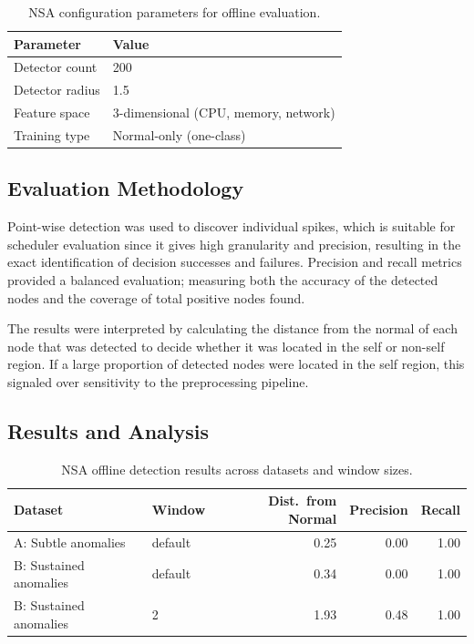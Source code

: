 \begin{table}[h]
    \centering
    \begin{tabular}{ll}
        \hline
        \textbf{Parameter} & \textbf{Value} \\
        \hline
        Detector count & 200 \\
        Detector radius & 1.5 \\
        Feature space & 3-dimensional (CPU, memory, network) \\
        Training type & Normal-only (one-class) \\
        \hline
    \end{tabular}
    \caption{NSA configuration parameters for offline evaluation.}
    \label{tab:nsa-params}
\end{table}

\subsection{Evaluation Methodology}

Point-wise detection was used to discover individual spikes, which is suitable for scheduler evaluation since it gives high granularity and precision, resulting in the exact identification of decision successes and failures. Precision and recall metrics provided a balanced evaluation; measuring both the accuracy of the detected nodes and the coverage of total positive nodes found.  

The results were interpreted by calculating the distance from the normal of each node that was detected to decide whether it was located in the self or non-self region. If a large proportion of detected nodes were located in the self region, this signaled over sensitivity to the preprocessing pipeline.

\subsection{Results and Analysis}

\begin{table}[h]
    \centering
    \begin{tabular}{llrrr}
        \hline
        \textbf{Dataset} & \textbf{Window} & \textbf{Dist.\ from Normal} & \textbf{Precision} & \textbf{Recall} \\
        \hline
        A: Subtle anomalies & default & 0.25 & 0.00 & 1.00 \\
        B: Sustained anomalies & default & 0.34 & 0.00 & 1.00 \\
        B: Sustained anomalies & 2 & 1.93 & 0.48 & 1.00 \\
        \hline
    \end{tabular}
    \caption{NSA offline detection results across datasets and window sizes.}
    \label{tab:results-offline}
\end{table}


